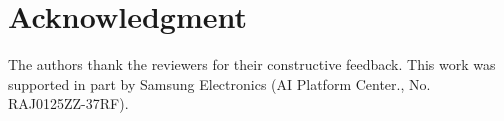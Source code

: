 \section*{Acknowledgment}\label{sec:ack}

The authors thank the reviewers for their constructive feedback. This work was supported in part by Samsung Electronics (AI Platform Center., No. RAJ0125ZZ-37RF).